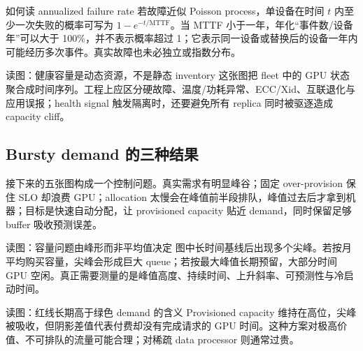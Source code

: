
\begin{warningbox}{如何读 annualized failure rate}
若故障近似 Poisson process，单设备在时间 $t$ 内至少一次失败的概率可写为 $1-e^{-t/\mathrm{MTTF}}$。当 MTTF 小于一年，年化“事件数/设备年”可以大于 100\%，并不表示概率超过 1；它表示同一设备或替换后的设备一年内可能经历多次事件。真实故障也未必独立或指数分布。
\end{warningbox}


\begin{knowledgebox}{读图：健康容量是动态资源，不是静态 inventory}
这张图把 fleet 中的 GPU 状态聚合成时间序列。工程上应区分硬故障、温度/功耗异常、ECC/Xid、互联退化与应用误报；health signal 触发隔离时，还要避免所有 replica 同时被驱逐造成 capacity cliff。
\end{knowledgebox}

\subsection{Bursty demand 的三种结果}

接下来的五张图构成一个控制问题。真实需求有明显峰谷；固定 over-provision 保住 SLO 却浪费 GPU；allocation 太慢会在峰值前半段排队，峰值过去后才拿到机器；目标是快速自动分配，让 provisioned capacity 贴近 demand，同时保留足够 buffer 吸收预测误差。


\begin{knowledgebox}{读图：容量问题由峰形而非平均值决定}
图中长时间基线后出现多个尖峰。若按月平均购买容量，尖峰会形成巨大 queue；若按最大峰值长期预留，大部分时间 GPU 空闲。真正需要测量的是峰值高度、持续时间、上升斜率、可预测性与冷启动时间。
\end{knowledgebox}


\begin{knowledgebox}{读图：红线长期高于绿色 demand 的含义}
Provisioned capacity 维持在高位，尖峰被吸收，但阴影差值代表付费却没有完成请求的 GPU 时间。这种方案对极高价值、不可排队的流量可能合理；对稀疏 data processor 则通常过贵。
\end{knowledgebox}

